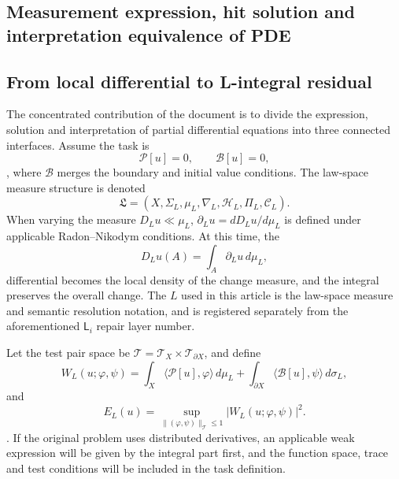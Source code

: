 \documentclass[11pt,a4paper]{article}
\theoremstyle{plain}
\theoremstyle{definition}
\theoremstyle{remark}
\begin{document}
\begin{CJK*}
\section { Measurement expression, hit solution and interpretation equivalence of PDE }\label{ss:pde}


\subsection { From local differential to L-integral residual }

The concentrated contribution of the document \cite{S36} is to divide the expression, solution and interpretation of partial differential equations into three connected interfaces. Assume the task is \[
 \mathcal P[u]=0,\qquad \mathcal B[u]=0,
\], where $\mathcal B$ merges the boundary and initial value conditions. The law-space measure structure is denoted \[
 \mathfrak L=(X,\Sigma_L,\mu_L,\nabla_L,\mathcal H_L,\Pi_L,\mathcal C_L).
\] When varying the measure $D_Lu\ll\mu_L$, $\partial_Lu=dD_Lu/d\mu_L$ is defined under applicable Radon--Nikodym conditions. At this time, the \[
 D_Lu(A)=\int_A\partial_Lu\,d\mu_L,
\] differential becomes the local density of the change measure, and the integral preserves the overall change. The $L$ used in this article is the law-space measure and semantic resolution notation, and is registered separately from the aforementioned $\mathsf L_i$ repair layer number.

Let the test pair space be $\mathcal T=\mathcal T_X\times\mathcal T_{\partial X}$, and define \[
 W_L(u;\varphi,\psi)
 =\int_X\langle\mathcal P[u],\varphi\rangle\,d\mu_L
 +\int_{\partial X}\langle\mathcal B[u],\psi\rangle\,d\sigma_L,
\] and \[
 E_L(u)=\sup_{\|(\varphi,\psi)\|_{\mathcal T}\le1}
              |W_L(u;\varphi,\psi)|^2.
\]. If the original problem uses distributed derivatives, an applicable weak expression will be given by the integral part first, and the function space, trace and test conditions will be included in the task definition.


\end{CJK*}
\end{document}
